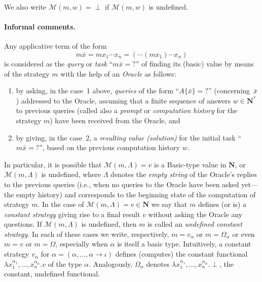 \documentclass[fleqn]{LMCS}
\theoremstyle{plain}\newtheorem{satz}[thm]{Satz}
\theoremstyle{plain}\newtheorem{hyp}[thm]{Hypothesis}
\theoremstyle{plain}\newtheorem{hyps}[thm]{Hypotheses}
\theoremstyle{definition}\newtheorem{note}[thm]{Note}
\newcommand{\arr}{\rightarrow}
\newcommand{\NN}{\mathbf{N}}
\newcommand{\Basictype}{\iota}
\newcommand{\Undef}{{\perp}}
\newcommand{\MM}{{\mathcal M}}
\newcommand{\bx}{\bar{x}}
\newcommand{\?}{\mbox{?}}
\begin{document}
\noindent
We also write $\MM(m,w)=\Undef$ if $\MM(m,w)$ is undefined. 


\paragraph*{\bf Informal comments.}
Any applicative term of the form 
\[
m\bx = mx_1\cdots x_n=(\cdots(mx_1)\cdots x_n)
\] 
is considered as the \emph{query} or \emph{task} ``$m\bx=\?$'' of finding its 
(basic) value by means of the strategy $m$ with the help of an \emph{Oracle} as follows:
\begin{enumerate}[$\bullet$]
\item
by asking, in the case~1
above, 
{\em queries\/} of the form ``$A\{\bx\}=\?$'' 
(concerning~$\bx$) 
addressed to the Oracle,
assuming that a finite sequence of answers $w\in\NN^*$ 
to previous queries 
(called also a \emph{prompt} or \emph{computation history} 
for the strategy $m$) 
have been
received from the Oracle, and 
\item
by giving,
in the case~2, a {\em resulting value (solution)\/} for the
initial task ``$m\bx=\?$'', based on the previous computation history $w$. 
\end{enumerate}
In particular, it is possible that
$\MM(m,\Lambda) = v$ is a Basic-type value in $\NN$, 
or $\MM(m,\Lambda)$ is undefined, where
$\Lambda$ denotes the \emph{empty string} of the Oracle's replies 
to the previous queries
(i.e., when no queries to the Oracle have been asked yet---the 
empty history) 
and 
corresponds to the beginning state of the computation of strategy $m$.
In the case of $\MM(m,\Lambda)=v\in\NN$ we say that $m$  
defines (or is) a \emph{constant strategy\/} giving rise 
to a final result $v$ without asking the Oracle any questions. 
If $\MM(m,\Lambda)$ is undefined, then $m$ is called 
an {\em undefined constant strategy\/}. 
In each of these cases we write, respectively,
$m=v_{\alpha}$ or $m=\Omega_{\alpha}$ or even
$m=v$ or $m=\Omega$, especially when $\alpha$ is itself a basic type. 
Intuitively, a constant strategy $v_\alpha$ for 
$\alpha=(\alpha,\ldots,\alpha\arr\Basictype)$ defines (computes) 
the constant functional $\lambda x_1^{\alpha_1},\ldots,x_n^{\alpha_n}.v$ 
of the type $\alpha$. Analogously, $\Omega_{\alpha}$ denotes 
$\lambda x_1^{\alpha_1},\ldots,x_n^{\alpha_n}.\Undef$, the constant, 
undefined functional. 
\end{document}
